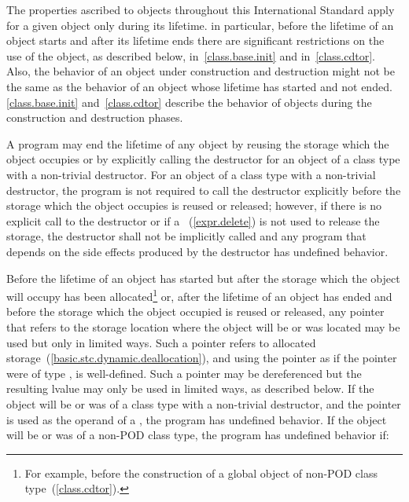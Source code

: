 \pnum
The properties ascribed to objects throughout this International
Standard apply for a given object only during its lifetime. \enternote
in particular, before the lifetime of an object starts and after its
lifetime ends there are significant restrictions on the use of the
object, as described below, in~\ref{class.base.init} and
in~\ref{class.cdtor}. Also, the behavior of an object under construction
and destruction might not be the same as the behavior of an object whose
lifetime has started and not ended. \ref{class.base.init}
and~\ref{class.cdtor} describe the behavior of objects during the
construction and destruction phases. \exitnote

\pnum
A program may end the lifetime of any object by reusing the storage
which the object occupies or by explicitly calling the destructor for an
object of a class type with a non-trivial destructor. For an object of a
class type with a non-trivial destructor, the program is not required to
call the destructor explicitly before the storage which the object
occupies is reused or released; however, if there is no explicit call to
the destructor or if a ~(\ref{expr.delete})
is not used to release the storage, the destructor shall not be
implicitly called and any program that depends on the side effects
produced by the destructor has undefined behavior.

\pnum
Before the lifetime of an object has started but after the storage which
the object will occupy has been allocated\footnote{For example, before the
construction of a global object of
non-POD class type~(\ref{class.cdtor}).}
or, after the lifetime of an object has ended and before the storage
which the object occupied is reused or released, any pointer that refers
to the storage location where the object will be or was located may be
used but only in limited ways. Such a pointer refers to allocated
storage~(\ref{basic.stc.dynamic.deallocation}), and using the pointer as
if the pointer were of type , is well-defined. Such a
pointer may be dereferenced but the resulting lvalue may only be used in
limited ways, as described below. If the object will be or was of a
class type with a non-trivial destructor, and the pointer is used as the
operand of a , the program has undefined
behavior. If the object will be or was of a non-POD class type, the
program has undefined behavior if:

